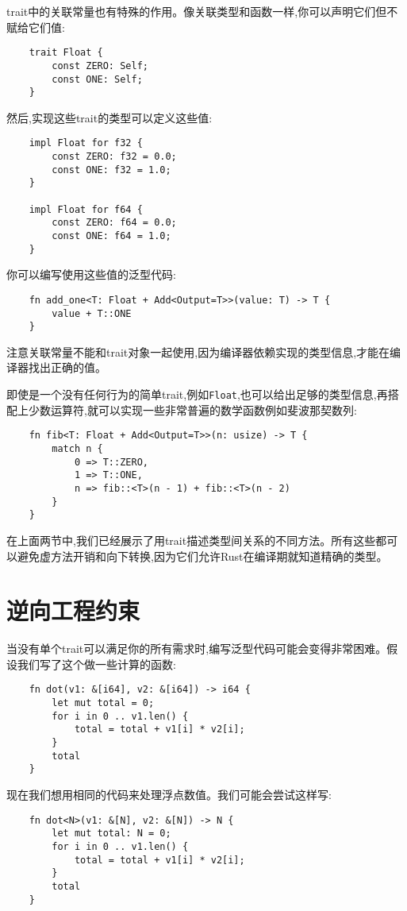 trait中的关联常量也有特殊的作用。像关联类型和函数一样,你可以声明它们但不赋给它们值:
\begin{verbatim}
    trait Float {
        const ZERO: Self;
        const ONE: Self;
    }
\end{verbatim}

然后,实现这些trait的类型可以定义这些值:
\begin{verbatim}
    impl Float for f32 {
        const ZERO: f32 = 0.0;
        const ONE: f32 = 1.0;
    }

    impl Float for f64 {
        const ZERO: f64 = 0.0;
        const ONE: f64 = 1.0;
    }
\end{verbatim}

你可以编写使用这些值的泛型代码:
\begin{verbatim}
    fn add_one<T: Float + Add<Output=T>>(value: T) -> T {
        value + T::ONE
    }
\end{verbatim}

注意关联常量不能和trait对象一起使用,因为编译器依赖实现的类型信息,才能在编译器找出正确的值。

即使是一个没有任何行为的简单trait,例如\texttt{Float},也可以给出足够的类型信息,再搭配上少数运算符,就可以实现一些非常普遍的数学函数例如斐波那契数列:
\begin{verbatim}
    fn fib<T: Float + Add<Output=T>>(n: usize) -> T {
        match n {
            0 => T::ZERO,
            1 => T::ONE,
            n => fib::<T>(n - 1) + fib::<T>(n - 2)
        }
    }
\end{verbatim}

在上面两节中,我们已经展示了用trait描述类型间关系的不同方法。所有这些都可以避免虚方法开销和向下转换,因为它们允许Rust在编译期就知道精确的类型。

\section{逆向工程约束}\label{RevBound}

当没有单个trait可以满足你的所有需求时,编写泛型代码可能会变得非常困难。假设我们写了这个做一些计算的函数:
\begin{verbatim}
    fn dot(v1: &[i64], v2: &[i64]) -> i64 {
        let mut total = 0;
        for i in 0 .. v1.len() {
            total = total + v1[i] * v2[i];
        }
        total
    }
\end{verbatim}

现在我们想用相同的代码来处理浮点数值。我们可能会尝试这样写:
\begin{verbatim}
    fn dot<N>(v1: &[N], v2: &[N]) -> N {
        let mut total: N = 0;
        for i in 0 .. v1.len() {
            total = total + v1[i] * v2[i];
        }
        total
    }
\end{verbatim}

